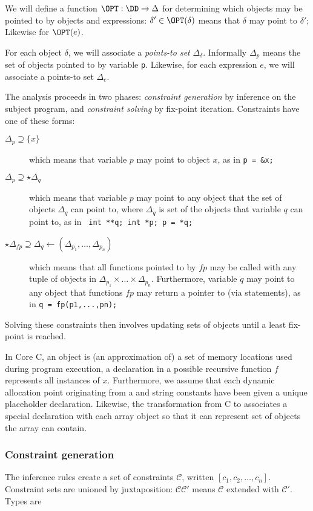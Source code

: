 \begin{docpart}
\begin{inferencesymbols}
We will define a function $\OPT : \DD ->\Delta$ for determining
which objects may be pointed to by objects and expressions: $\delta'
\in \OPT(\delta)$ means that $\delta$ may point to $\delta'$; Likewise
for $\OPT(e)$.

For each object $\delta$, we will associate a \emph{points-to set}
$\Delta_{\delta}$. Informally $\Delta_p$ means the set of objects
pointed to by variable \texttt{p}. Likewise, for each expression $e$,
we will associate a points-to set $\Delta_{e}$.

The analysis proceeds in two phases: \emph{constraint generation} by
inference on the subject program, and \emph{constraint solving} by
fix-point iteration. Constraints have one of these forms:

\begin{description}
\item[$\Delta_p \supseteq \{x\}$] which means that variable $p$ may
  point to object $x$, as in \texttt{p = \&x;}
\item[$\Delta_p \supseteq \star\Delta_q$] which means that variable
  $p$ may point to any object that the set of objects $\Delta_q$ can
  point to, where $\Delta_q$ is set of the objects that variable $q$
  can point to, as in \texttt{ int **q; int *p; p = *q;}
\item[$\star\Delta_{f\!p} \supseteq \Delta_q\leftarrow
  (\Delta_{p_1},\dots,\Delta_{p_n})$] which means that all functions
  pointed to by $f\!p$ may be called with any tuple of objects in
  $\Delta_{p_1} \times \dots \times \Delta_{p_n}$. Furthermore,
  variable $q$ may point to any object that functions $f\!p$ may
  return a pointer to (via  statements), as in
  \texttt{q = fp(p1,...,pn);}
\end{description}

\noindent
Solving these constraints then involves updating sets of objects until
a least fix-point is reached.

In Core C, an object is (an approximation of) a set of memory
locations used during program execution, \ie a declaration  in a possible recursive function $f$ represents all instances of
$x$.  Furthermore, we assume that each dynamic allocation point
originating from a  and string constants have been
given a unique placeholder declaration. Likewise, the transformation
from C to \coreC associates a special declaration with each array
object so that it can represent set of objects the array can contain.

\subsubsection{Constraint generation}
The inference rules create a set of constraints $\mathcal{C}$, written
$[c_1,c_2,\dots,c_n]$.  Constraint sets are unioned by juxtaposition:
$\mathcal{C}\mathcal{C}'$ means $\mathcal{C}$ extended with
$\mathcal{C}'$. Types are


\end{inferencesymbols}
\end{docpart}
